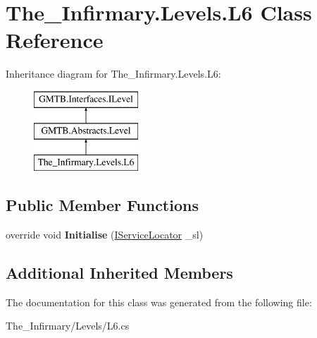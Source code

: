 \hypertarget{class_the___infirmary_1_1_levels_1_1_l6}{}\section{The\+\_\+\+Infirmary.\+Levels.\+L6 Class Reference}
\label{class_the___infirmary_1_1_levels_1_1_l6}
Inheritance diagram for The\+\_\+\+Infirmary.\+Levels.\+L6\+:\begin{figure}[H]
\begin{center}
\leavevmode
\includegraphics[height=3.000000cm]{class_the___infirmary_1_1_levels_1_1_l6}
\end{center}
\end{figure}
\subsection*{Public Member Functions}
\begin{DoxyCompactItemize}
\item 
\mbox{\label{class_the___infirmary_1_1_levels_1_1_l6_a430f45237d92f3cae4db4e3399c30029}} 
override void {\bfseries Initialise} (\mbox{\hyperlink{interface_g_m_t_b_1_1_interfaces_1_1_i_service_locator}{I\+Service\+Locator}} \+\_\+sl)
\end{DoxyCompactItemize}
\subsection*{Additional Inherited Members}


The documentation for this class was generated from the following file\+:\begin{DoxyCompactItemize}
\item 
The\+\_\+\+Infirmary/\+Levels/L6.\+cs\end{DoxyCompactItemize}
